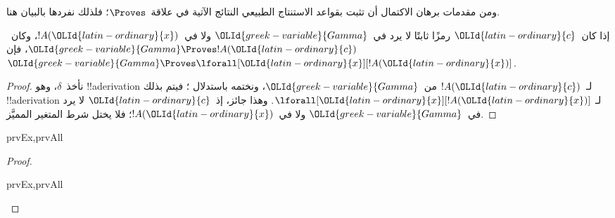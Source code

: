 \documentclass[../../../include/open-logic-section]{subfiles}
\begin{document}


\begin{explain}
  ومن مقدمات برهان الاكتمال أن تثبت بقواعد الاستنتاج الطبيعي
  النتائج الآتية في علاقة~$\Proves$؛ فلذلك نفردها بالبيان هنا.
\end{explain}

\begin{thm}
 إذا كان~$\OLId{latin-ordinary}{c}$ رمزًا ثابتًا لا يرد
في~$\OLId{greek-variable}{Gamma}$ ولا في~$!A(\OLId{latin-ordinary}{x})$، وكان~$\OLId{greek-variable}{Gamma} \Proves !A(\OLId{latin-ordinary}{c})$، فإن
$\OLId{greek-variable}{Gamma} \Proves \lforall[\OLId{latin-ordinary}{x}][!A(\OLId{latin-ordinary}{x})]$.
\end{thm}

\begin{proof}
نأخذ~$\delta$، وهو !!a{derivation} لـ~$!A(\OLId{latin-ordinary}{c})$ من~$\OLId{greek-variable}{Gamma}$، ونختمه
باستدلال \Intro{\lforall}؛ فيتم بذلك !!a{derivation} لـ
$\lforall[\OLId{latin-ordinary}{x}][!A(\OLId{latin-ordinary}{x})]$. وهذا جائز، إذ~$\OLId{latin-ordinary}{c}$ لا يرد في~$\OLId{greek-variable}{Gamma}$ ولا
في~$!A(\OLId{latin-ordinary}{x})$؛ فلا يختل شرط المتغير المميَّز.
\end{proof}

\begin{prop}
\begin{tagenumerate}{prvEx,prvAll}

\end{tagenumerate}
\end{prop}

\begin{proof}
\begin{tagenumerate}{prvEx,prvAll}

\end{tagenumerate}
\end{proof}
\end{document}
